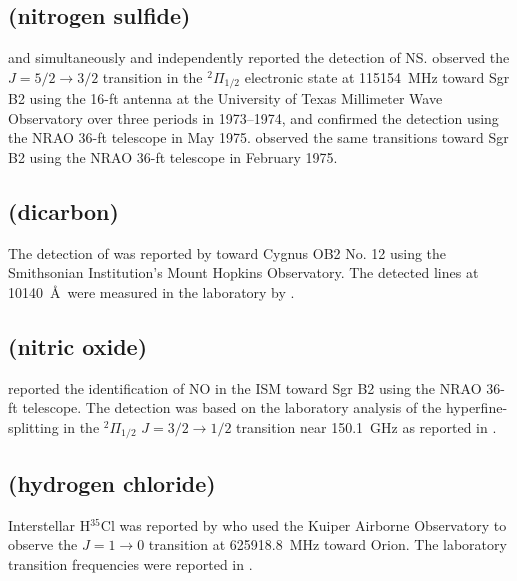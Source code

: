 \documentclass[twocolumn]{aastex631}
\begin{document}
    \subsection{ (nitrogen sulfide)}
    \label{NS}
    
    \citet{Gottlieb:1975ke} and \citet{Kuiper:1975er} simultaneously and independently reported the detection of NS.  \citet{Gottlieb:1975ke} observed the $J=5/2\rightarrow3/2$ transition in the $^2\Pi_{1/2}$ electronic state at 115154~MHz \citep{Amano:1969yc} toward Sgr B2 using the 16-ft antenna at the University of Texas Millimeter Wave Observatory over three periods in 1973--1974, and confirmed the detection using the NRAO 36-ft telescope in May 1975.  \citet{Kuiper:1975er} observed the same transitions toward Sgr B2 using the NRAO 36-ft telescope in February 1975.
    
    \subsection{ (dicarbon)}
    \label{C2}
    
    The detection of  was reported by \citet{Souza:1977mk} toward Cygnus OB2 No. 12 using the Smithsonian Institution's Mount Hopkins Observatory.  The detected lines at 10140~\AA~were measured in the laboratory by \citet{Phillips:1948jp}.
    
    \subsection{ (nitric oxide)}
    \label{NO}
    
    \citet{Liszt:1978ep} reported the identification of NO in the ISM toward Sgr B2 using the NRAO 36-ft telescope.  The detection was based on the laboratory analysis of the hyperfine-splitting in the $^2\Pi_{1/2}$ $J = 3/2\rightarrow1/2$ transition near 150.1~GHz as reported in \citet{Gallagher:1956om}.
    
    \subsection{ (hydrogen chloride)}
    \label{HCl}
    
    Interstellar H$^{35}$Cl was reported by \citet{Blake:1985pf} who used the Kuiper Airborne Observatory to observe the $J = 1\rightarrow0$ transition at 625918.8~MHz toward Orion.  The laboratory transition frequencies were reported in \citet{deLucia:1971lq}.
    
\end{document}

